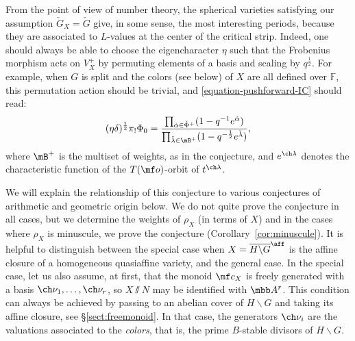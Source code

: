 \documentclass[final]{amsart}
\theoremstyle{remark}
\theoremstyle{definition}
\numberwithin{equation}{section}
\begin{document}
From the point of view of number theory, the spherical varieties satisfying our assumption $\check G_X=\check G$ give, in some sense, the most interesting periods, because they are associated to $L$-values at the center of the critical strip. Indeed, one should always be able to choose the eigencharacter $\eta$ such that the Frobenius morphism acts on $V_X^+$ by permuting elements of a basis and scaling by $q^\frac{1}{2}$. 
For example, when $G$ is split and the colors (see below) of $X$ are all defined over $\mathbb F$, this permutation action should be trivial, and \eqref{equation-pushforward-IC} should read:
\begin{equation}\label{equation-pushforward-IC-expl}
(\eta\delta)^\frac{1}{2} \pi_! \Phi_0 = \frac{\prod_{\check\alpha\in\check\Phi^+} (1-q^{-1} e^{\check\alpha})}{\prod_{\check\lambda \in \mB^+} (1-q^{-\frac{1}{2}} e^{\check\lambda})},  
\end{equation}
where $\mB^+$ is the multiset of weights, as in the conjecture, and $e^{\ch\lambda}$ denotes the characteristic function of the $T(\mf o)$-orbit of $t^{\ch\lambda}$.

We will explain the relationship of this conjecture to various conjectures of arithmetic and geometric origin below. We do not quite prove the conjecture in all cases, but we determine the weights of $\rho_X$ 
(in terms of $X$) 
and in the cases where $\rho_X$ is minuscule, we prove the conjecture (Corollary~\ref{cor:minuscule}). 
It is helpful to distinguish between the special case when $X = \overline{H\backslash G}^\aff$ is the affine closure of a homogeneous quasiaffine variety, and the general case. In the special case, let us also assume, at first, that 
the monoid $\mf c_X$ is freely generated with a basis $\ch\nu_1,\dotsc, \ch\nu_r$, so 
$X\sslash N$ may be identified with $\mbb A^r$. This condition can always be achieved by passing to an abelian cover of $H\backslash G$ and taking its affine closure, see \S \ref{sect:freemonoid}. In that case, the generators $\ch\nu_i$ are the valuations associated to the \emph{colors}, that is, the prime $B$-stable divisors of $H\backslash G$. 
\end{document}

